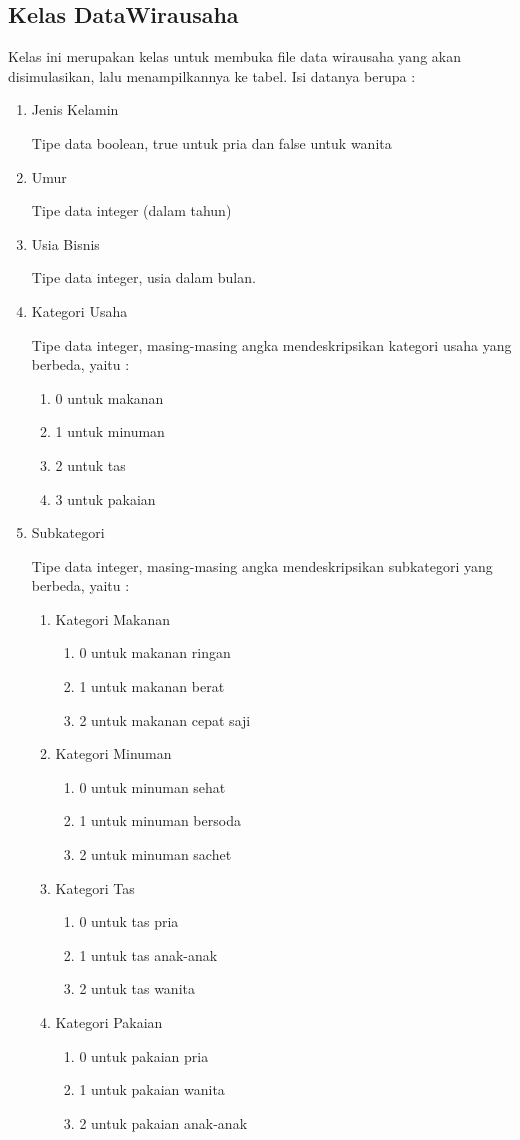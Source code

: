 \subsection{Kelas DataWirausaha}
Kelas ini merupakan kelas untuk membuka file data wirausaha yang akan disimulasikan, lalu menampilkannya ke tabel. Isi datanya berupa :
\begin{enumerate}
	\item Jenis Kelamin
	
	
	Tipe data boolean, true untuk pria dan false untuk wanita
	\item Umur
	
	
	Tipe data integer (dalam tahun)
	\item Usia Bisnis
	
	
	Tipe data integer, usia dalam bulan.
	\item Kategori Usaha
	
	
	Tipe data integer, masing-masing angka mendeskripsikan kategori usaha yang berbeda, yaitu :
		\begin{enumerate}
		\item 0 untuk makanan
		\item 1 untuk minuman 
		\item 2 untuk tas
		\item 3 untuk pakaian
		\end{enumerate}
	\item Subkategori
	
	
	Tipe data integer, masing-masing angka mendeskripsikan subkategori yang berbeda, yaitu :
	\begin{enumerate}
		\item Kategori Makanan
			\begin{enumerate}
				\item 0 untuk makanan ringan
				\item 1 untuk makanan berat
				\item 2 untuk makanan cepat saji
			\end{enumerate}
		\item Kategori Minuman
			\begin{enumerate}
				\item 0 untuk minuman sehat
				\item 1 untuk minuman bersoda
				\item 2 untuk minuman sachet
			\end{enumerate}
		\item Kategori Tas
			\begin{enumerate}
				\item 0 untuk tas pria
				\item 1 untuk tas anak-anak
				\item 2 untuk tas wanita
			\end{enumerate}
		\item Kategori Pakaian
			\begin{enumerate}
				\item 0 untuk pakaian pria
				\item 1 untuk pakaian wanita
				\item 2 untuk pakaian anak-anak
	\end{enumerate}
	\end{enumerate}


\end{enumerate}
